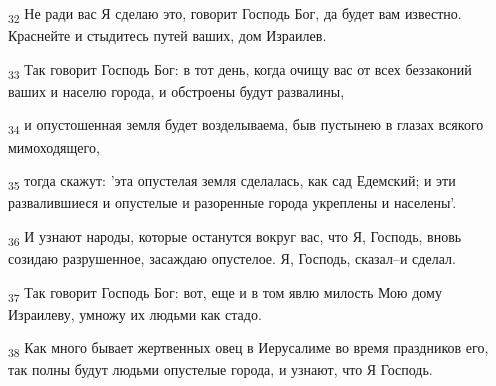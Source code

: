 \begin{tcolorbox}
\textsubscript{32} Не ради вас Я сделаю это, говорит Господь Бог, да будет вам известно. Краснейте и стыдитесь путей ваших, дом Израилев.
\end{tcolorbox}
\begin{tcolorbox}
\textsubscript{33} Так говорит Господь Бог: в тот день, когда очищу вас от всех беззаконий ваших и населю города, и обстроены будут развалины,
\end{tcolorbox}
\begin{tcolorbox}
\textsubscript{34} и опустошенная земля будет возделываема, быв пустынею в глазах всякого мимоходящего,
\end{tcolorbox}
\begin{tcolorbox}
\textsubscript{35} тогда скажут: 'эта опустелая земля сделалась, как сад Едемский; и эти развалившиеся и опустелые и разоренные города укреплены и населены'.
\end{tcolorbox}
\begin{tcolorbox}
\textsubscript{36} И узнают народы, которые останутся вокруг вас, что Я, Господь, вновь созидаю разрушенное, засаждаю опустелое. Я, Господь, сказал--и сделал.
\end{tcolorbox}
\begin{tcolorbox}
\textsubscript{37} Так говорит Господь Бог: вот, еще и в том явлю милость Мою дому Израилеву, умножу их людьми как стадо.
\end{tcolorbox}
\begin{tcolorbox}
\textsubscript{38} Как много бывает жертвенных овец в Иерусалиме во время праздников его, так полны будут людьми опустелые города, и узнают, что Я Господь.
\end{tcolorbox}
